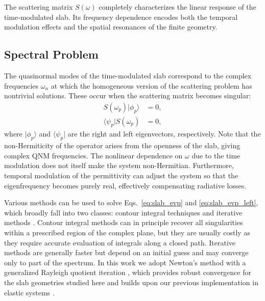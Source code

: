 \documentclass[%
 reprint,
 amsmath,amssymb,
 aps,
 prb,
]{revtex4-2}
\newcommand{\corrections}[1]{#1}
\begin{document}
The scattering matrix ${S}(\omega)$ completely characterizes the linear response of the time-modulated slab. Its frequency dependence encodes both the temporal modulation effects and the spatial resonances of the finite geometry.

\subsection{Spectral Problem}
\label{subsec:qnm_eigenvalue}

The quasinormal modes of the time-modulated slab correspond to the complex frequencies $\omega_n$ at which the homogeneous version of the scattering problem has nontrivial solutions. These occur when the scattering matrix becomes singular:
\begin{align}
{S}(\omega_p)|\phi_p\rangle &= 0, \label{eq:slab_evp} \\
\langle\psi_p| {S}(\omega_p) &= 0, \label{eq:slab_evp_left}
\end{align}
where $|\phi_p\rangle$ and $\langle\psi_p|$ are the right and left eigenvectors, respectively.
\corrections{Note that the non-Hermiticity of the operator arises from the openness of the slab, giving complex QNM frequencies. The nonlinear dependence on
$\omega$ due to the time modulation does not itself make the system non-Hermitian.}
\corrections{Furthermore, temporal modulation of the permittivity can adjust the system so that the eigenfrequency becomes purely real, effectively compensating radiative losses.}

\corrections{Various methods can be used to solve Eqs.~\eqref{eq:slab_evp} and \eqref{eq:slab_evp_left}, which broadly fall into two classes: contour integral techniques \cite{beynIntegralMethodSolving2012,chenLocatingZerosPoles2022,vanbarelNonlinearEigenvalueProblems2016} and iterative methods \cite{guttelNonlinearEigenvalueProblem2017}. Contour integral methods can in principle recover all singularities within a prescribed region of the complex plane, but they are usually costly as they require accurate evaluation of integrals along a closed path. Iterative methods are generally faster but depend on an initial guess and may converge only to part of the spectrum. In this work we adopt Newton's method with a generalized Rayleigh quotient iteration \cite{ruheAlgorithmsNonlinearEigenvalue1973,guttel2017nonlinear}, which provides robust convergence for the slab geometries studied here and builds upon our previous implementation in elastic systems \cite{vial2024a}.
}
\end{document}
